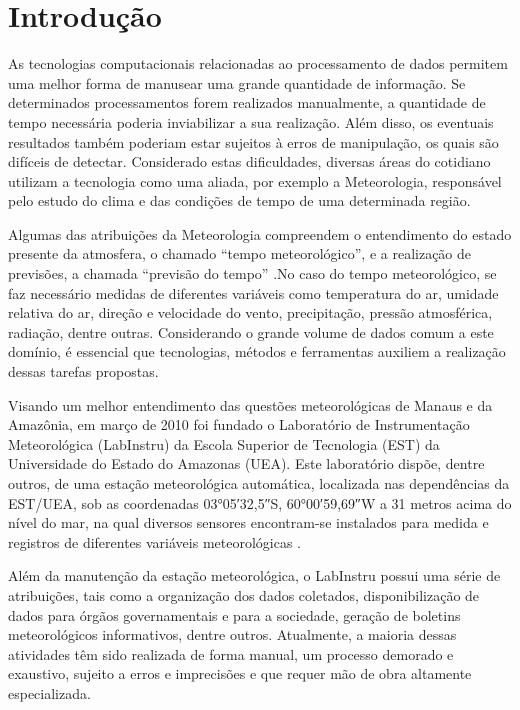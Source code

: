 \chapter{Introdução}

As tecnologias computacionais relacionadas ao processamento de dados permitem uma melhor forma de manusear uma grande quantidade de informação. Se determinados processamentos forem realizados manualmente, a quantidade de tempo necessária poderia inviabilizar a sua realização. Além disso, os eventuais resultados também poderiam estar sujeitos à erros de manipulação, os quais são difíceis de detectar. Considerado estas dificuldades, diversas áreas do cotidiano utilizam a tecnologia como uma aliada, por exemplo a Meteorologia, responsável pelo estudo do clima e das condições de tempo de uma determinada região.

Algumas das atribuições da Meteorologia compreendem o entendimento do estado presente da atmosfera, o chamado ``tempo meteorológico'', e a realização de previsões, a chamada ``previsão do tempo'' \cite{Vianello:Livro}.No caso do tempo meteorológico, se faz necessário medidas de diferentes variáveis como temperatura do ar, umidade relativa do ar, direção e velocidade do vento, precipitação, pressão atmosférica, radiação, dentre outras. Considerando o grande volume de dados comum a este domínio, é essencial que tecnologias, métodos e ferramentas auxiliem a realização dessas tarefas propostas.

Visando um melhor entendimento das questões meteorológicas de Manaus e da Amazônia, em março de 2010 foi fundado o Laboratório de Instrumentação Meteorológica (LabInstru) da Escola Superior de Tecnologia (EST) da Universidade do Estado do Amazonas (UEA). Este laboratório dispõe, dentre outros, de uma estação meteorológica automática, localizada nas dependências da EST/UEA, sob as coordenadas \ang{03;05;32,5}S, \ang{60;00;59,69}W a 31 metros acima do nível do mar, na qual diversos sensores encontram-se instalados para medida e registros de diferentes variáveis meteorológicas \cite{Labinstru:EST}.

Além da manutenção da estação meteorológica, o LabInstru possui uma série de atribuições, tais como a organização dos dados coletados, disponibilização de dados para órgãos governamentais e para a sociedade, geração de boletins meteorológicos informativos, dentre outros. Atualmente, a maioria dessas atividades têm sido realizada de forma manual, um processo demorado e exaustivo, sujeito a erros e imprecisões e que requer mão de obra altamente especializada.

